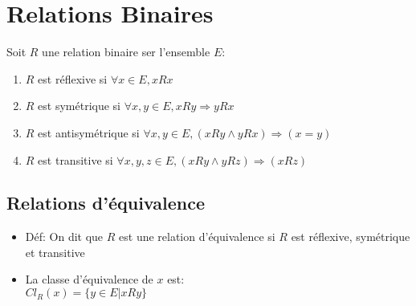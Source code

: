 \documentclass[fleqn]{article}
\begin{document}
\section{Relations Binaires}
Soit \(R\) une relation binaire ser l'ensemble \(E\):
\begin{enumerate}
	\item \(R\) est r\'eflexive si \(\forall x \in E, xRx\)
	\item \(R\) est sym\'etrique si \(\forall x,y \in E, xRy \Rightarrow yRx\)
	\item \(R\) est antisym\'etrique si \(\forall x,y \in E, (xRy \land yRx) \Rightarrow (x=y)\)
	\item \(R\) est transitive si \(\forall x,y,z \in E, (xRy \land yRz) \Rightarrow (xRz)\)
\end{enumerate}

\subsection{Relations d'\'equivalence}
\begin{itemize}
	\item D\'ef: On dit que \(R\) est une relation d'\'equivalence si \(R\) est r\'eflexive, sym\'etrique et transitive
	\item La classe d'\'equivalence de \(x\) est: \\
		\(Cl_R(x) = \{y \in E |xRy\}\)
\end{itemize}
\end{document}

